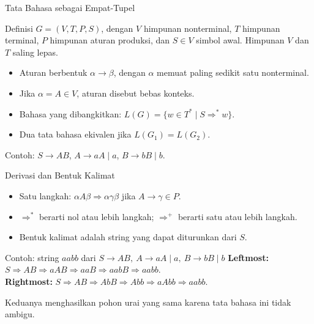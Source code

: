 \documentclass[aspectratio=169,10pt,t]{beamer}
\begin{document}
\begin{frame}{Tata Bahasa sebagai Empat-Tupel}
  \begin{block}{Definisi}
    \(G = (V, T, P, S)\), dengan \(V\) himpunan nonterminal, \(T\)
    himpunan terminal, \(P\) himpunan aturan produksi, dan \(S \in V\)
    simbol awal. Himpunan \(V\) dan \(T\) saling lepas.
  \end{block}

  \begin{itemize}
    \item Aturan berbentuk \(\alpha \to \beta\), dengan \(\alpha\)
          memuat paling sedikit satu nonterminal.
    \item Jika \(\alpha = A \in V\), aturan disebut bebas konteks.
    \item Bahasa yang dibangkitkan:
          \(L(G) = \{w \in T^{*} \mid S \Rightarrow^{*} w\}\).
    \item Dua tata bahasa ekivalen jika \(L(G_1)=L(G_2)\).
  \end{itemize}

  \vspace{2pt}
  {\footnotesize\color{ubbblue!80}Contoh:
  \(S \to AB\), \(A \to aA \mid a\), \(B \to bB \mid b\).}
\end{frame}

\begin{frame}{Derivasi dan Bentuk Kalimat}
  \begin{itemize}
    \item Satu langkah: \(\alpha A\beta \Rightarrow \alpha\gamma\beta\)
          jika \(A \to \gamma \in P\).
    \item \(\Rightarrow^{*}\) berarti nol atau lebih langkah;
          \(\Rightarrow^{+}\) berarti satu atau lebih langkah.
    \item Bentuk kalimat adalah string yang dapat diturunkan dari \(S\).
  \end{itemize}

  \vspace{3pt}
  \begin{exampleblock}{Contoh: string \(aabb\) dari
    \(S \to AB,\ A \to aA \mid a,\ B \to bB \mid b\)}
    \footnotesize
    \textbf{Leftmost:}
    \(S \Rightarrow AB \Rightarrow aAB \Rightarrow aaB
     \Rightarrow aabB \Rightarrow aabb\).\\
    \textbf{Rightmost:}
    \(S \Rightarrow AB \Rightarrow AbB \Rightarrow Abb
     \Rightarrow aAbb \Rightarrow aabb\).
  \end{exampleblock}

  \vspace{2pt}
  {\footnotesize Keduanya menghasilkan pohon urai yang sama karena
  tata bahasa ini tidak ambigu.}
\end{frame}
\end{document}
